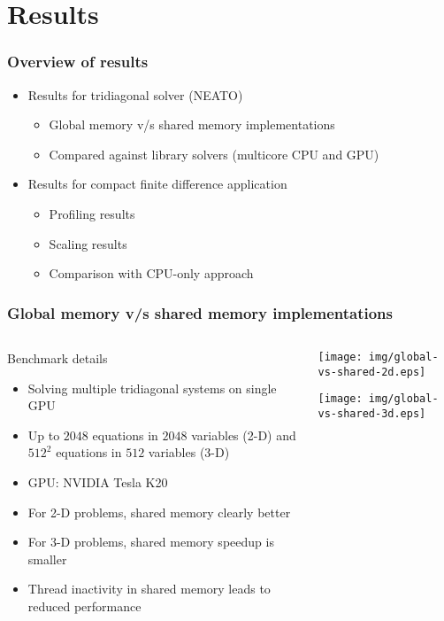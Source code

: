 \section{Results}

\begin{frame}
\frametitle{Overview of results}
\begin{itemize}
\item Results for tridiagonal solver (NEATO)
\begin{itemize}
    \item Global memory v/s shared memory implementations
    \item Compared against library solvers
        (multicore CPU and GPU)
\end{itemize}
\item Results for compact finite difference application
\begin{itemize}
    \item Profiling results
    \item Scaling results
    \item Comparison with CPU-only approach
\end{itemize}
\end{itemize}
\end{frame}

\begin{frame}
\frametitle{Global memory v/s shared memory implementations}
\footnotesize
\begin{columns}
\begin{column}{0.5\textwidth}

\begin{block}{Benchmark details}
\begin{itemize}
\item Solving multiple tridiagonal systems on single GPU
\item Up to $2048$ equations in $2048$ variables (2-D)
    and $512^2$ equations in $512$ variables (3-D)
\item GPU: NVIDIA Tesla K20
\end{itemize}
\end{block}

\begin{itemize}
\item For 2-D problems, shared memory clearly better
\item For 3-D problems, shared memory speedup
    is smaller
\item Thread inactivity in shared memory leads
    to reduced performance
\end{itemize}
\end{column}
\begin{column}{0.5\textwidth}
\centering
\texttt{[image: img/global-vs-shared-2d.eps]}

\texttt{[image: img/global-vs-shared-3d.eps]}
\end{column}
\end{columns}
\end{frame}


